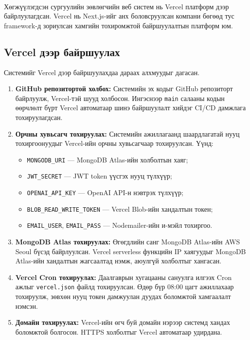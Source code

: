 \paragraph{}
Хөгжүүлэгдсэн сургуулийн зөвлөгчийн веб систем нь Vercel платформ
дээр байрлуулагдсан. Vercel нь Next.js-ийг анх боловсруулсан компани
бөгөөд тус framework-д зориулсан хамгийн тохиромжтой байршуулалтын
платформ юм.

\subsection*{Vercel дээр байршуулах}

Системийг Vercel дээр байршуулахдаа дараах алхмуудыг дагасан.

\begin{enumerate}
    \item \textbf{GitHub репозитортой холбох:} Системийн эх кодыг
    GitHub репозиторт байрлуулж, Vercel-тэй шууд холбосон. Ингэснээр
    \texttt{main} салааны кодын өөрчлөлт бүрт Vercel автоматаар
    шинэ байршуулалт хийдэг CI/CD дамжлага тохируулагдсан.

    \item \textbf{Орчны хувьсагч тохируулах:} Системийн ажиллагаанд
    шаардлагатай нууц тохиргоонуудыг Vercel-ийн орчны хувьсагчаар
    тохируулсан. Үүнд:
    \begin{itemize}
        \item \texttt{MONGODB\_URI} --- MongoDB Atlas-ийн холболтын хаяг;
        \item \texttt{JWT\_SECRET} --- JWT token үүсгэх нууц түлхүүр;
        \item \texttt{OPENAI\_API\_KEY} --- OpenAI API-н нэвтрэх түлхүүр;
        \item \texttt{BLOB\_READ\_WRITE\_TOKEN} --- Vercel Blob-ийн хандалтын токен;
        \item \texttt{EMAIL\_USER}, \texttt{EMAIL\_PASS} --- Nodemailer-ийн и-мэйл тохиргоо.
    \end{itemize}

    \item \textbf{MongoDB Atlas тохируулах:} Өгөгдлийн санг MongoDB
    Atlas-ийн AWS Seoul бүсэд байрлуулсан. Vercel serverless
    функцийн IP хаягуудыг MongoDB Atlas-ийн хандалтын жагсаалтад
    нэмж, аюулгүй холболтыг хангасан.

    \item \textbf{Vercel Cron тохируулах:} Даалгаврын хугацааны
    сануулга илгээх Cron ажлыг \texttt{vercel.json} файлд тохируулсан.
    Өдөр бүр 08:00 цагт ажиллахаар тохируулж, зөвхөн нууц токен
    дамжуулан дуудах боломжтой хамгаалалт нэмсэн.

    \item \textbf{Домайн тохируулах:} Vercel-ийн өгч буй домайн нэрээр
    системд хандах боломжтой болгосон. HTTPS холболтыг Vercel
    автоматаар удирдана.
\end{enumerate}

